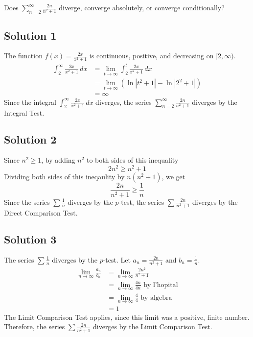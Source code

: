 \documentclass{article}
\begin{document}
\noindent
Does $\displaystyle \sum_{n=2}^\infty \frac{2n}{n^2+1}$
diverge, converge absolutely, or converge conditionally?

\subsection*{Solution 1}

The function $f(x)=\frac{2x}{x^2+1}$ is continuous, positive, and decreasing on $[2,\infty)$.
\begin{align*}
\int_2^\infty \frac{2x}{x^2+1}\,dx
&= \lim_{t \to \infty} \int_2^t \frac{2x}{x^2+1}\,dx\\
&= \lim_{t \to \infty} (\ln|t^2+1| - \ln |2^2+1|)\\
&= \infty
\end{align*}
Since the integral $\displaystyle \int_2^\infty \frac{2x}{x^2+1}\,dx$ diverges, the series $\displaystyle \sum_{n=2}^\infty \frac{2n}{n^2+1}$ diverges by the Integral Test.

\subsection*{Solution 2}

Since $n^2 \geq 1$, by adding $n^2$ to both sides of this inequality
\[ 2n^2 \geq n^2 + 1\]
Dividing both sides of this ineqaulity by $n(n^2+1)$, we get
\[ \frac{2n}{n^2+1} \geq \frac1n\]
Since the series $\sum \frac1{n}$ diverges by the $p$-test, the series $\sum \frac{2n}{n^2+1}$ diverges by the Direct Comparison Test.

\subsection*{Solution 3}

The series $\sum \frac1{n}$ diverges by the $p$-test. Let $a_n = \frac{2n}{n^2+1}$ and $b_n = \frac1{n}$.
\begin{align*}
\lim_{n \to \infty} \frac{a_n}{b_n}
&= \lim_{n \to \infty} \frac{2n^2}{n^2+1}\\
&= \lim_{n \to \infty} \frac{4n}{4n} \text{ by l'hopital}\\
&= \lim_{n \to \infty} \frac44 \text{ by algebra}\\
&= 1
\end{align*}
The Limit Comparison Test applies, since this limit was a positive, finite number. Therefore, the series $\sum \frac{2n}{n^2+1}$ diverges by the Limit Comparison Test.
\end{document}
